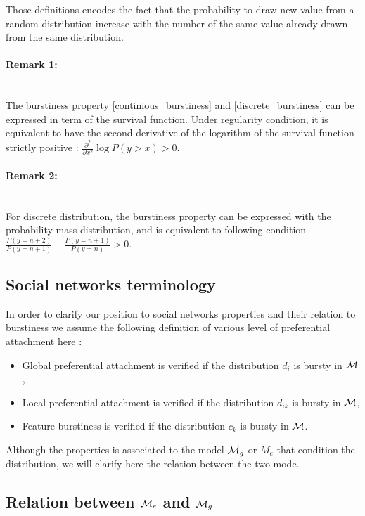 Those definitions encodes the fact that the probability to draw new value from a random distribution increase with the number of the same value already drawn from the same distribution.

\paragraph{Remark 1:}~\\
The burstiness property \ref{continious_burstiness} and \ref{discrete_burstiness} can be expressed in term of the survival function. Under regularity  condition, it is equivalent to have the second derivative of the logarithm of the survival function strictly positive \cite{clinchant2010information} : 
$ \frac{\partial^2}{\partial x^2} \log P(y>x) > 0$.

\paragraph{Remark 2:}~\\ \label{eq:burst_mass}
For discrete distribution, the burstiness property can be expressed with the probability mass distribution, and is equivalent to following condition $\frac{P(y = n+2)}{P(y=n+1)} - \frac{P(y = n+1)}{P(y=n)} > 0$.

\subsection{Social networks terminology}

In order to clarify our position to social networks properties and their relation to burstiness we assume the following definition of various level of preferential attachment here :
\begin{itemize}
    \item Global preferential attachment is verified if the distribution $d_i$ is bursty in $\mathcal{M}$,
    \item Local preferential attachment is verified if the distribution $d_{ik}$ is bursty in $\mathcal{M}$,
    \item Feature burstiness is verified if the distribution $c_k$ is bursty in $\mathcal{M}$.
\end{itemize}

Although the properties is associated to the model $\mathcal{M}_g$ or $M_e$ that condition the distribution, we will clarify here the relation between the two mode.

\subsection{Relation between $\mathcal{M}_e$ and $\mathcal{M}_g$}

